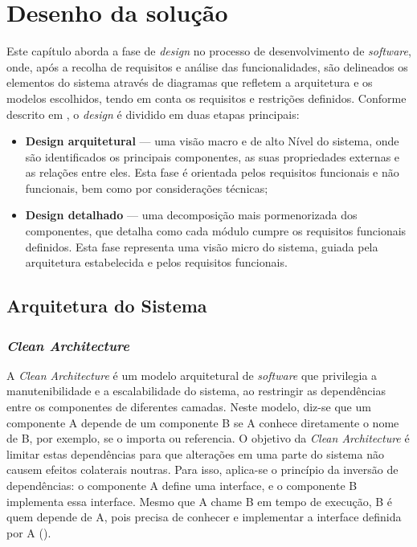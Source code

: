 \chapter{Desenho da solução}
\label{chap:DS}

Este capítulo aborda a fase de \textit{design} no processo de desenvolvimento de \textit{software}, onde, após a recolha de requisitos e análise das funcionalidades, são delineados os elementos do sistema através de diagramas que refletem a arquitetura e os modelos escolhidos, tendo em conta os requisitos e restrições definidos. Conforme descrito em \cite{tsui2022essentials}, o \textit{design} é dividido em duas etapas principais:

\begin{itemize}
    \item \textbf{Design arquitetural} — uma visão macro e de alto Nível do sistema, onde são identificados os principais componentes, as suas propriedades externas e as relações entre eles. Esta fase é orientada pelos requisitos funcionais e não funcionais, bem como por considerações técnicas;
    \item \textbf{Design detalhado} — uma decomposição mais pormenorizada dos componentes, que detalha como cada módulo cumpre os requisitos funcionais definidos. Esta fase representa uma visão micro do sistema, guiada pela arquitetura estabelecida e pelos requisitos funcionais.
\end{itemize}


\section{Arquitetura do Sistema} 

\subsection{\textit{Clean Architecture}}

A \textit{Clean Architecture} é um modelo arquitetural de \textit{software} que privilegia a manutenibilidade e a escalabilidade do sistema, ao restringir as dependências entre os componentes de diferentes camadas. Neste modelo, diz-se que um componente A depende de um componente B se A conhece diretamente o nome de B, por exemplo, se o importa ou referencia. O objetivo da \textit{Clean Architecture} é limitar estas dependências para que alterações em uma parte do sistema não causem efeitos colaterais noutras. Para isso, aplica-se o princípio da inversão de dependências: o componente A define uma interface, e o componente B implementa essa interface. Mesmo que A chame B em tempo de execução, B é quem depende de A, pois precisa de conhecer e implementar a interface definida por A (\cite{Lano2023}).

